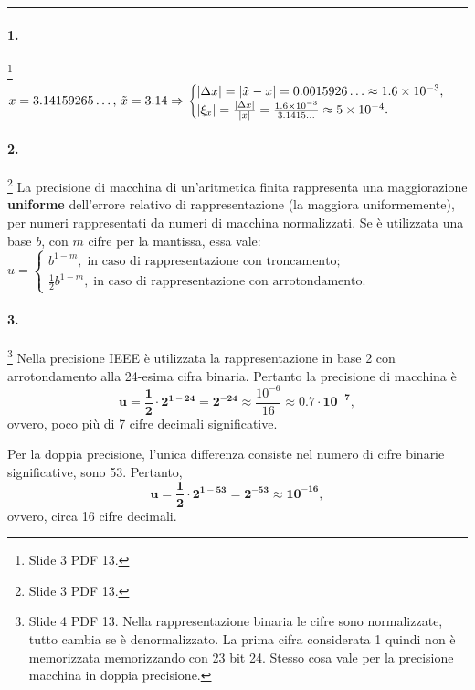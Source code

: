 \hrule

\paragraph{1.}\footnote{Slide 3 PDF 13.} $x = 3.14159265\hdots,\, \Tilde{x}=3.14\Rightarrow\begin{cases}
	|\Delta x|=|\Tilde{x}-x|=0.0015926\hdots\approx 1.6\times 10^{-3},\\
	|\xi_x|=\frac{|\Delta x|}{|x|}=\frac{1.6\times 10^{-3}}{3.1415\hdots}\approx 5\times 10^{-4}.
\end{cases}$

\paragraph{2.}\footnote{Slide 3 PDF 13.} La precisione di macchina di un'aritmetica finita rappresenta una maggiorazione \textbf{uniforme} dell'errore relativo di rappresentazione (la  \gls{maggiora uniformemente}), per numeri rappresentati da numeri di macchina normalizzati. Se è utilizzata una base $b$, con $m$ cifre per la mantissa, essa vale: $u=\begin{cases}
	b^{1-m},\;\text{in caso di rappresentazione con troncamento};\\
	\frac{1}{2}b^{1-m},\;\text{in caso di rappresentazione con arrotondamento.}
\end{cases}$

\paragraph{3.}\footnote{Slide 4 PDF 13. Nella rappresentazione binaria le cifre sono normalizzate, tutto cambia se è denormalizzato. La prima cifra considerata 1 quindi non è memorizzata memorizzando con 23 bit 24. Stesso cosa vale per la precisione macchina in doppia precisione.} Nella precisione IEEE è utilizzata la rappresentazione in base 2 con arrotondamento alla 24-esima cifra binaria. Pertanto la precisione di macchina è
\begin{equation*}
	\boldsymbol{u=\frac{1}{2}\cdot 2^{1-24}=2^{-24}}\approx\frac{10^{-6}}{16}\approx\boldsymbol{0.7\cdot 10^{-7}},
\end{equation*}
ovvero, poco più di 7 cifre decimali significative.

\noindent Per la doppia precisione, l'unica differenza consiste nel numero di cifre binarie significative, sono 53. Pertanto, 
\begin{equation*}
	\boldsymbol{u=\frac{1}{2}\cdot 2^{1-53}=2^{-53}\approx 10^{-16}},
\end{equation*}
ovvero, circa 16 cifre decimali.

